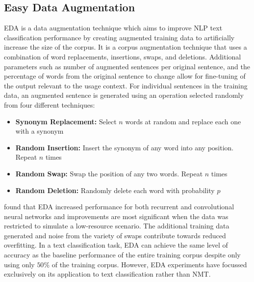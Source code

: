 





\subsection{Easy Data Augmentation}
\acrfull{EDA} is a data augmentation technique which aims to improve \acrshort{NLP} text classification performance by creating augmented training data to artificially increase the size of the corpus. It is a corpus augmentation technique that uses a combination of word replacements, insertions, swaps, and deletions. Additional parameters such as number of augmented sentences per original sentence, and the percentage of words from the original sentence to change allow for fine-tuning of the output relevant to the usage context. For individual sentences in the training data, an augmented sentence is generated using an operation selected randomly from four different techniques:
\begin{itemize}
    \item \textbf{Synonym Replacement:} Select $n$ words at random and replace each one with a synonym
    \item \textbf{Random Insertion:} Insert the synonym of any word into any position. Repeat $n$ times
    \item \textbf{Random Swap:} Swap the position of any two words. Repeat $n$ times
    \item \textbf{Random Deletion:} Randomly delete each word with probability $p$
\end{itemize}

\cite{wei_eda:_2019} found that \acrshort{EDA} increased performance for both recurrent and convolutional neural networks and improvements are most significant when the data was restricted to simulate a low-resource scenario. The additional training data generated and noise from the variety of swaps contribute towards reduced overfitting. In a text classification task, \acrshort{EDA} can achieve the same level of accuracy as the baseline performance of the entire training corpus despite only using only $50$\% of the training corpus. However, \acrshort{EDA} experiments have focussed exclusively on its application to text classification rather than \acrshort{NMT}.

